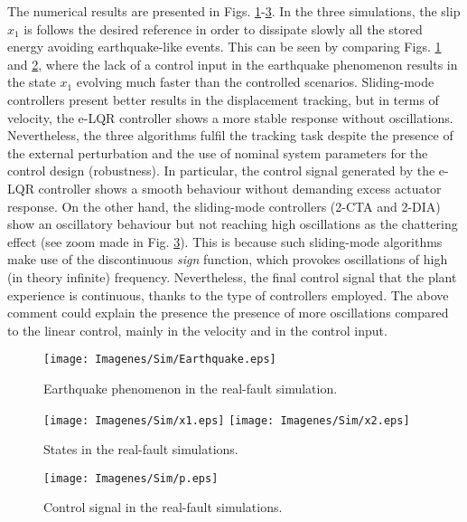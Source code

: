 \documentclass[journal,twoside,web]{ieeecolor}
\begin{document}
The numerical results are presented in Figs. \ref{fig:earthquakesim}-\ref{fig:p1}. In the three simulations, the slip $x_1$ is follows the desired reference in order to dissipate slowly all the stored energy avoiding earthquake-like events. This can be seen by comparing Figs. \ref{fig:earthquakesim} and \ref{fig:x1}, where the lack of a control input in the earthquake phenomenon results in the state $x_1$ evolving much faster than the controlled scenarios. Sliding-mode controllers present better results in the displacement tracking, but in terms of velocity, the e-LQR controller shows a more stable response without oscillations. Nevertheless, the three algorithms fulfil the tracking task despite the presence of the external perturbation and the use of nominal system parameters for the control design (robustness). In particular, the control signal generated by the e-LQR controller shows a smooth behaviour without demanding excess actuator response. On the other hand, the sliding-mode controllers (2-CTA and 2-DIA) show an oscillatory behaviour but not reaching high oscillations as the chattering effect (see zoom made in Fig. \ref{fig:p1}). This is because such sliding-mode algorithms make use of the discontinuous \textit{sign} function, which provokes oscillations of high (in theory infinite) frequency. Nevertheless, the final control signal that the plant experience is continuous, thanks to the type of controllers employed. The above comment could explain the presence the presence of more oscillations compared to the linear control, mainly in the velocity and in the control input.

\begin{figure}[ht!]
  \centering 
  \texttt{[image: Imagenes/Sim/Earthquake.eps]}
  \caption{Earthquake phenomenon in the real-fault simulation.}
  \label{fig:earthquakesim}
\end{figure}

\begin{figure}[ht!]
  \centering 
  \texttt{[image: Imagenes/Sim/x1.eps]}
  \texttt{[image: Imagenes/Sim/x2.eps]}
  \caption{States in the real-fault simulations.}
  \label{fig:x1}
\end{figure}

\begin{figure}[ht!]
  \centering 
  \texttt{[image: Imagenes/Sim/p.eps]}
  \caption{Control signal in the real-fault simulations.}
  \label{fig:p1}
\end{figure}
\end{document}
